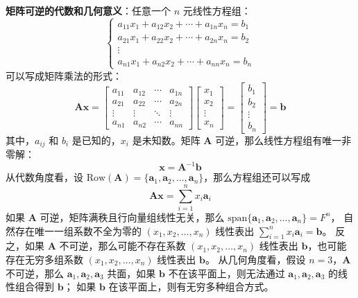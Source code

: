 \vspace{1em}

\textbf{矩阵可逆的代数和几何意义}：任意一个 $n$ 元线性方程组：
\[
    \begin{cases}
        a_{11}x_1 + a_{12}x_2 + \cdots + a_{1n}x_n = b_1 \\
        a_{21}x_1 + a_{22}x_2 + \cdots + a_{2n}x_n = b_2 \\
        \vdots \\
        a_{n1}x_1 + a_{n2}x_2 + \cdots + a_{nn}x_n = b_n
    \end{cases}
\]
可以写成矩阵乘法的形式：
\[
    \mathbf{A}\mathbf{x} = \begin{bmatrix}
        a_{11} & a_{12} & \cdots & a_{1n} \\
        a_{21} & a_{22} & \cdots & a_{2n} \\
        \vdots & \vdots & \ddots & \vdots \\
        a_{n1} & a_{n2} & \cdots & a_{nn}
    \end{bmatrix}\begin{bmatrix}
        x_1 \\
        x_2 \\
        \vdots\\
        x_n
    \end{bmatrix}=
    \begin{bmatrix}
        b_1 \\
        b_2 \\
        \vdots\\
        b_n
    \end{bmatrix} = \mathbf{b}
\]
其中，$a_{ij}$ 和 $b_i$ 是已知的，$x_i$ 是未知数。矩阵 $\mathbf{A}$ 可逆，那么线性方程组有唯一非零解：
\[
    \mathbf{x} = \mathbf{A}^{-1}\mathbf{b}
\]
从代数角度看，设 $\mathrm{Row}(\mathbf{A}) = \{\mathbf{a}_1,\mathbf{a}_2,\ldots,\mathbf{a}_n\}$，那么方程组还可以写成
\[
    \mathbf{A}\mathbf{x} = \sum^n_{i=1}x_i\mathbf{a}_i
\]
如果 $\mathbf{A}$ 可逆，矩阵满秩且行向量组线性无关，那么 $\mathrm{span}\{\mathbf{a}_1,\mathbf{a}_2,\ldots,\mathbf{a}_n\} = F^n$，
自然存在唯一一组系数不全为零的 $(x_1,x_2,\ldots,x_n)$ 线性表出 $\sum^n_{i=1}x_i\mathbf{a}_i = \mathbf{b}$。
反之，如果 $\mathbf{A}$ 不可逆，那么可能不存在系数 $(x_1,x_2,\ldots,x_n)$ 线性表出 $\mathbf{b}$，也可能存在无穷多组系数 $(x_1,x_2,\ldots,x_n)$ 线性表出 $\mathbf{b}$。
从几何角度看，假设 $n=3$，$\mathbf{A}$ 不可逆，那么 $\mathbf{a}_1,\mathbf{a}_2,\mathbf{a}_3$ 共面，如果 $\mathbf{b}$ 不在该平面上，则无法通过 $\mathbf{a}_1,\mathbf{a}_2,\mathbf{a}_3$ 的线性组合得到 $\mathbf{b}$；
如果 $\mathbf{b}$ 在该平面上，则有无穷多种组合方式。

